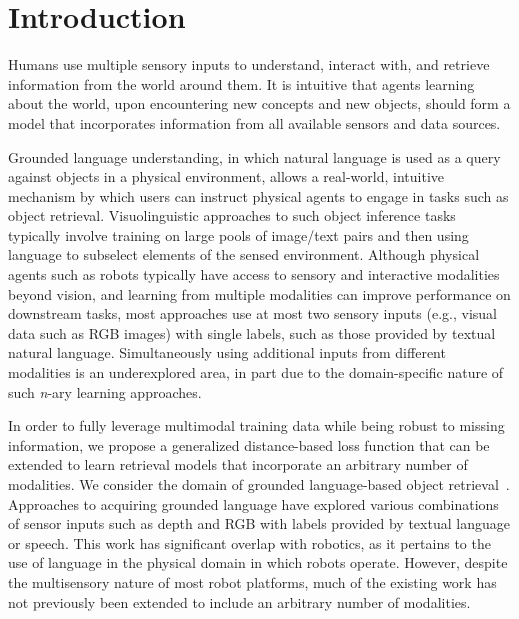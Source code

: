 \documentclass[sigconf,natbib=true,anonymous=true]{acmart}
\begin{document}

\section{Introduction}
\label{intro}

Humans use multiple sensory inputs to understand, interact with, and retrieve information from the world around them. It is intuitive that agents learning about the world, upon encountering new concepts and new objects, should form a model that incorporates information from all available sensors and data sources. 

Grounded language understanding, in which natural language is used as a query against objects in a physical environment, allows a real-world, intuitive mechanism by which users can instruct physical agents to engage in tasks such as object retrieval. Visuolinguistic approaches to such object inference tasks typically involve training on large pools of image/text pairs and then using language to subselect elements of the sensed environment. Although physical agents such as robots typically have access to sensory and interactive modalities beyond vision, and learning from multiple modalities can improve performance on downstream tasks, most approaches use at most two sensory inputs (e.g., visual data such as RGB images) with single labels, such as those provided by textual natural language. Simultaneously using additional inputs from different modalities is an underexplored area, in part due to the domain-specific nature of such \textit{n}-ary learning approaches.

In order to fully leverage multimodal training data while being robust to missing information, we propose a generalized distance-based loss function that can be extended to learn retrieval models that incorporate an arbitrary number of modalities.
We consider the domain of grounded language-based object retrieval~\cite{Mooney2008Grounded, RichardsDarvishMatuszekCategoryFree20, triplet_loss_2021_CVPR}.
Approaches to acquiring grounded language have explored various combinations of sensor inputs such as depth and RGB with labels provided by textual language or speech. This work has significant overlap with robotics, as it pertains to the use of language in the physical domain in which robots operate. However, despite the multisensory nature of most robot platforms, much of the existing work has not previously been extended to include an arbitrary number of modalities.
\end{document}
